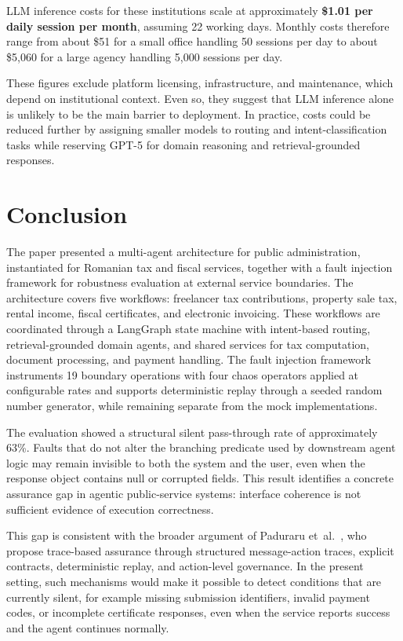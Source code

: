 \documentclass[3p,times,procedia]{elsarticle}
\begin{document}
LLM inference costs for these institutions scale at approximately \textbf{\$1.01 per daily session per month}, assuming 22 working days. Monthly costs therefore range from about \$51 for a small office handling 50 sessions per day to about \$5{,}060 for a large agency handling 5{,}000 sessions per day.

These figures exclude platform licensing, infrastructure, and maintenance, which depend on institutional context. Even so, they suggest that LLM inference alone is unlikely to be the main barrier to deployment. In practice, costs could be reduced further by assigning smaller models to routing and intent-classification tasks while reserving GPT-5 for domain reasoning and retrieval-grounded responses.

\section{Conclusion}
\label{sec:conclusion}

The paper presented a multi-agent architecture for public administration, instantiated for Romanian tax and fiscal services, together with a fault injection framework for robustness evaluation at external service boundaries. The architecture covers five workflows: freelancer tax contributions, property sale tax, rental income, fiscal certificates, and electronic invoicing. These workflows are coordinated through a LangGraph state machine with intent-based routing, retrieval-grounded domain agents, and shared services for tax computation, document processing, and payment handling. The fault injection framework instruments 19 boundary operations with four chaos operators applied at configurable rates and supports deterministic replay through a seeded random number generator, while remaining separate from the mock implementations.

The evaluation showed a structural silent pass-through rate of approximately 63\%. Faults that do not alter the branching predicate used by downstream agent logic may remain invisible to both the system and the user, even when the response object contains null or corrupted fields. This result identifies a concrete assurance gap in agentic public-service systems: interface coherence is not sufficient evidence of execution correctness.

This gap is consistent with the broader argument of Paduraru et~al.~\cite{Paduraru2026}, who propose trace-based assurance through structured message-action traces, explicit contracts, deterministic replay, and action-level governance. In the present setting, such mechanisms would make it possible to detect conditions that are currently silent, for example missing submission identifiers, invalid payment codes, or incomplete certificate responses, even when the service reports success and the agent continues normally.
\end{document}
